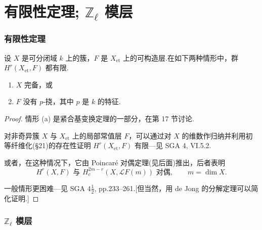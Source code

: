 ﻿%
\chapter{\texorpdfstring{有限性定理; $\mathbb{Z}_{\ell}$ 模层}{有限性定理；Z\_l 模层}}\label{sec:19}

\subsection*{有限性定理}

\begin{theorem}\label{thm:19.1}
设 $X$ 是可分闭域 $k$ 上的簇，$F$ 是 $X_{\mathrm{et}}$ 上的可构造层.在如下两种情形中，群 $H^{r}(X_{\mathrm{et}}, F)$ 都有限.
\begin{enumerate}
  \item $X$ 完备，或
  \item $F$ 没有 $p$-挠，其中 $p$ 是 $k$ 的特征.
\end{enumerate}
\end{theorem}

\begin{proof}
情形 (a) 是紧合基变换定理的一部分，在第 17 节讨论.

对非奇异簇 $X$ 与 $X_{\mathrm{et}}$ 上的局部常值层 $F$，可以通过对 $X$ 的维数作归纳并利用初等纤维化(\S 21)的存在性证明 $H^{r}(X_{\mathrm{et}}, F)$ 有限---见 SGA 4, VI.5.2.

或者，在这种情况下，它由 Poincar\'e 对偶定理(见后面)推出，后者表明
\[
H^{r}(X, F) \text{ 与 } H^{2m-r}_{c}(X, \mathcal{L}F(m)) \text{ 对偶}, \qquad m = \dim X.
\]

一般情形更困难---见 SGA $4\frac{1}{2}$, pp.233--261.[但当然，用 de Jong 的分解定理可以简化证明.]
\end{proof}

\subsection*{\texorpdfstring{$\mathbb{Z}_{\ell}$ 模层}{Z\_l 模层}}

